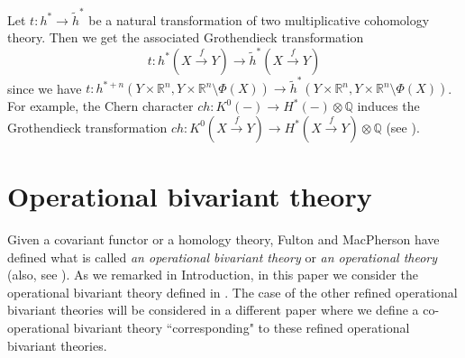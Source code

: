 \documentclass[a4paper]{amsart}
\begin{document}
\begin{rem}\label{contra}
Let $t: h^* \to \widetilde h^*$ be a natural transformation of two multiplicative cohomology theory. Then we get the associated Grothendieck transformation
\begin{equation}\label{bivari-h}
t:h^*( X \xrightarrow f Y) \to \widetilde h^*( X \xrightarrow f Y) 
\end{equation}
since we have $t: h^{*+n}(Y \times \mathbb R^n, Y \times \mathbb R^n \setminus \Phi(X)) \to \widetilde h^*(Y \times \mathbb R^n, Y \times \mathbb R^n \setminus \Phi(X))$. For example, the Chern character
$ch: K^0(-) \to H^*(-) \otimes \mathbb Q$ induces the Grothendieck transformation
$ch: K^0(X \xrightarrow f Y) \to H^*(X \xrightarrow f Y) \otimes \mathbb Q$ (see \cite[\S 3.2.2 \underline{Examples}]{FM}).
\end{rem}
\section{Operational bivariant theory}\label{obt}
Given a covariant functor or a homology theory, Fulton and MacPherson have defined what is called \emph{an operational bivariant theory} or \emph{an operational theory} \cite[\S 8 \underline{Operational Theories}]{FM} (also, see \cite[\S 17. 1 and \S 17.2]{Ful}). As we remarked in Introduction, in this paper we consider the operational bivariant theory defined in \cite[\S 8.1]{FM}. The case of the other refined operational bivariant theories will be considered in a different paper where we define
a co-operational bivariant theory ``corresponding" to these refined operational bivariant theories.
\end{document}
